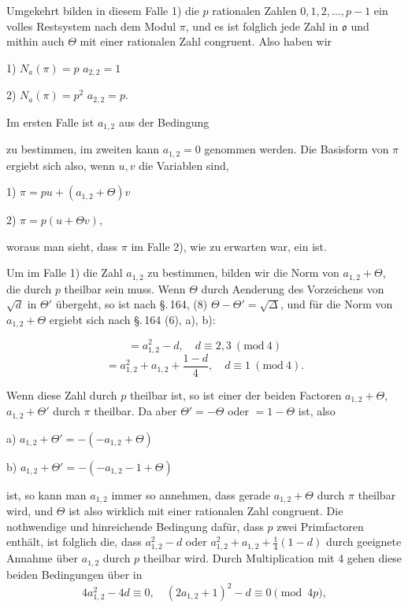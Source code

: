 Umgekehrt bilden in diesem Falle 1) die $p$ rationalen Zahlen $0, 1, 2, \ldots, p-1$ ein volles Restsystem nach dem Modul $\pi$, und es ist folglich jede Zahl in $\mathfrak{o}$ und mithin auch $\Theta$ mit einer rationalen Zahl congruent. Also haben wir

1) \quad $N_a(\pi) = p$ \quad $a_{2,2} = 1$

2) \quad $N_a(\pi) = p^2$ \quad $a_{2,2} = p.$

Im ersten Falle ist $a_{1,2}$ aus der Bedingung

zu bestimmen, im zweiten kann $a_{1,2} = 0$ genommen werden. Die Basisform von $\pi$ ergiebt sich also, wenn $u, v$ die Variablen sind,

1) \quad $\pi = pu + (a_{1,2}+\Theta)v$

2) \quad $\pi = p(u+\Theta v),$

woraus man sieht, dass $\pi$ im Falle 2), wie zu erwarten war, ein  ist.

Um im Falle 1) die Zahl $a_{1,2}$ zu bestimmen, bilden wir die Norm von $a_{1,2}+\Theta$, die durch $p$ theilbar sein muss. Wenn $\Theta$ durch Aenderung des Vorzeichens von $\sqrt{d}$ in $\Theta'$ \"ubergeht, so ist nach \S.\,164, (8) $\Theta - \Theta' = \sqrt{\Delta}$, und f\"ur die Norm von $a_{1,2}+\Theta$ ergiebt sich nach \S.\,164 (6), a), b):

\[ {} = a_{1,2}^2 - d, \quad d\equiv 2, 3\ (\mathrm{mod}\ 4) \]
\[ {} = a_{1,2}^2 + a_{1,2} + \frac{1-d}{4}, \quad d\equiv 1\ (\mathrm{mod}\ 4). \]

Wenn diese Zahl durch $p$ theilbar ist, so ist einer der beiden Factoren $a_{1,2}+\Theta$, $a_{1,2}+\Theta'$ durch $\pi$ theilbar. Da aber $\Theta' = -\Theta$ oder $=1-\Theta$ ist, also

a) \quad $a_{1,2} + \Theta' = -(-a_{1,2}+\Theta)$

b) \quad $a_{1,2} + \Theta' = -(-a_{1,2}-1+\Theta)$

ist, so kann man $a_{1,2}$ immer so annehmen, dass gerade $a_{1,2}+\Theta$ durch $\pi$ theilbar wird, und $\Theta$ ist also wirklich mit einer rationalen Zahl congruent. Die nothwendige und hinreichende Bedingung daf\"ur, dass $p$ zwei Primfactoren enth\"alt, ist folglich die, dass $a_{1,2}^2 - d$ oder $a_{1,2}^2 + a_{1,2} + \frac14(1-d)$ durch geeignete Annahme \"uber $a_{1,2}$ durch $p$ theilbar wird. Durch Multiplication mit 4 gehen diese beiden Bedingungen \"uber in
\[ 4a_{1,2}^2 - 4d \equiv 0, \quad (2a_{1,2}+1)^2 - d \equiv 0 \pmod{4p}, \]
